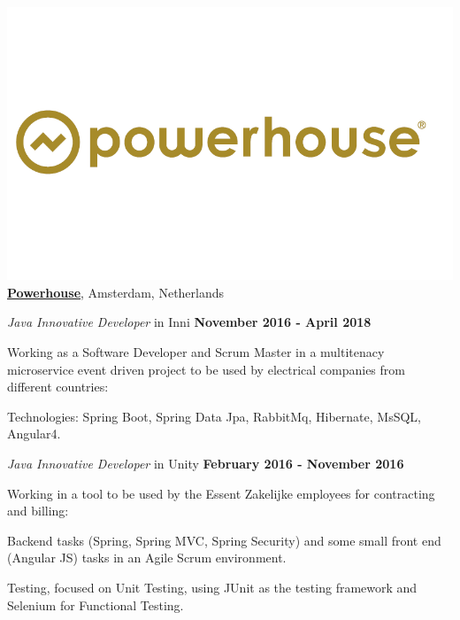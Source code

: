 \includegraphics[scale=0.1]{companies/powerhouse.png} \href{http://www.powerhouse.nl/}{\textbf{Powerhouse}},
Amsterdam, Netherlands
\begin{outerlist}
\item[] \textit{Java Innovative Developer} in Inni%
        \hfill \textbf{November 2016 - April 2018}

Working as a Software Developer and Scrum Master in a multitenacy microservice event driven project to be used by electrical companies from different countries:
\begin{innerlist}
\item Technologies: Spring Boot, Spring Data Jpa, RabbitMq, Hibernate, MsSQL, Angular4.
\end{innerlist}
\item[] \textit{Java Innovative Developer} in Unity%
        \hfill \textbf{February 2016 - November 2016}

Working in a tool to be used by the Essent Zakelijke employees for contracting and billing:
\begin{innerlist}
\item Backend tasks (Spring, Spring MVC, Spring Security) and some small front end (Angular JS) tasks in an Agile Scrum environment.
\item Testing, focused on Unit Testing, using JUnit as the testing framework and Selenium for Functional Testing.
\end{innerlist}
\end{outerlist}

